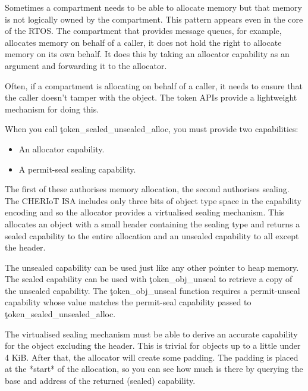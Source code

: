 Sometimes a compartment needs to be able to allocate memory but that memory is not logically owned by the compartment.
This pattern appears even in the core of the RTOS.
The compartment that provides message queues, for example, allocates memory on behalf of a caller, it does not hold the right to allocate memory on its own behalf.
It does this by taking an allocator capability as an argument and forwarding it to the allocator.

Often, if a compartment is allocating on behalf of a caller, it needs to ensure that the caller doesn't tamper with the object.
The token APIs provide a lightweight mechanism for doing this.




When you call \c{token_sealed_unsealed_alloc}, you must provide two capabilities:

\begin{itemize}
	\item{An allocator capability.}
	\item{A permit-seal sealing capability.}
\end{itemize}

The first of these authorises memory allocation, the second authorises sealing.
The CHERIoT ISA includes only three bits of object type space in the capability encoding and so the allocator provides a virtualised sealing mechanism.
This allocates an object with a small header containing the sealing type and returns a sealed capability to the entire allocation and an unsealed capability to all except the header.

The unsealed capability can be used just like any other pointer to heap memory.
The sealed capability can be used with \c{token_obj_unseal} to retrieve a copy of the unsealed capability.
The \c{token_obj_unseal} function requires a permit-unseal capability whose value matches the permit-seal capability passed to \c{token_sealed_unsealed_alloc}.

\begin{note}
The virtualised sealing mechanism must be able to derive an accurate capability for the object excluding the header.
This is trivial for objects up to a little under 4 KiB.
After that, the allocator will create some padding.
The padding is placed at the *start* of the allocation, so you can see how much is there by querying the base and address of the returned (sealed) capability.
\end{note}

